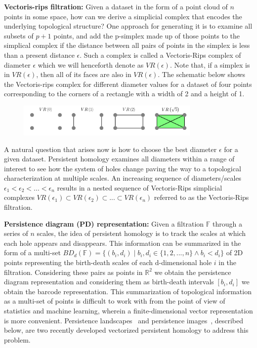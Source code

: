 \documentclass{article}
\begin{document}
\smallskip
\noindent \textbf{Vectoris-rips filtration:} Given a dataset in the form of a point cloud of $n$ points in some space, how can we derive a simplicial complex that encodes the underlying topological structure? One approach for generating it is to examine all subsets of $p+1$ points, and add the p-simplex made up of those points to the simplical complex if the distance between all pairs of points in the simplex is less than a present distance $\epsilon$. Such a complex is called a Vectoris-Rips complex of diameter $\epsilon$ which we will henceforth denote as $VR(\epsilon)$. Note that, if a simplex is in $VR(\epsilon)$, then all of its faces are also in $VR(\epsilon)$. The schematic below shows the Vectoris-rips complex for different diameter values for a dataset of four points corresponding to the corners of a rectangle with a width of 2 and a height of 1.
\vspace{-0.2cm}
%
\begin{figure}[!h]
\centering
\includegraphics[width=3.5in]{figures/vrcomplex-diagram.png}
\end{figure}
%

\noindent A natural question that arises now is how to choose the best diameter $\epsilon$ for a given dataset. Persistent homology examines all diameters within a range of interest to see how the system of holes change paving the way to a topological characterization at multiple scales. An increasing sequence of diameters/scales $\epsilon_1 < \epsilon_2 < ... < \epsilon_n$ results in a nested sequence of Vectoris-Rips simplicial complexes $VR(\epsilon_1) \subset VR(\epsilon_2) \subset ... \subset VR(\epsilon_n)$ referred to as the Vectoris-Rips filtration.

\smallskip
\noindent \textbf{Persistence diagram (PD) representation:} Given a filtration $\mathbb{F}$ through a series of $n$ scales, the idea of persistent homology is to track the scales at which each hole appears and disappears. This information can be summarized in the form of a multi-set $BD_d(\mathbb{F}) = \{(b_i, d_i) \mid b_i, d_i \in \{1, 2, ..., n\} \land b_i < d_i \}$ of 2D points representing the birth-death scales of each d-dimensional hole $i$ in the filtration. Considering these pairs as points in $\mathbb{R}^2$ we obtain the persistence diagram representation and considering them as birth-death intervals $[b_i, d_i]$ we obtain the barcode representation. This summarization of topological information as a multi-set of points is difficult to work with from the point of view of statistics and machine learning, wherein a finite-dimensional vector representation is more convenient. Persistence landscapes~\cite{Adams2015} and persistence images~\cite{Bubenik2012}, described below, are two recently developed vectorized persistent homology to address this problem.
\end{document}
